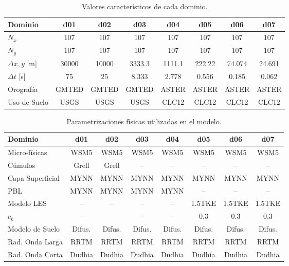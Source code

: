 \begin{table}[h!]
	\caption{Valores característicos de cada dominio.}\label{tab:05_caract_hov}
	\centering\footnotesize
	\begin{tabular}{lccccccc}
		\toprule
		Dominio 				& d01	&	d02	&	d03	&	d04	&	d05	&	d06 &	d07 \\
		\midrule
		$N_x$		& 107 & 107 & 107 &107&107&107&107  \\
		$N_y$	 		& 107 & 107 & 107 &107&107&107&107  \\
		$\Delta x, y$	[m]	 		& 30000 & 10000 & 3333.3 &1111.1&222.22&74.074&24.691  \\
		$\Delta t$	[s]	 		& 75 & 25 & 8.333 &2.778&0.556&0.185&0.062  \\
		Orografía		 	& GMTED & GMTED & GMTED &ASTER&ASTER&ASTER&ASTER  \\
		Uso de Suelo					& USGS & USGS & USGS &CLC12&CLC12&CLC12&CLC12 \\
		\bottomrule
	\end{tabular}
\end{table}

\begin{table}[h!]
	\caption{Parametrizaciones físicas utilizadas en el modelo.}\label{tab:05_param_hov}
	\centering\footnotesize
	\begin{tabular}{lccccccc}
		\toprule
		Dominio 				& d01	&	d02	&	d03	&	d04	&	d05	&	d06 &	d07 \\
		\midrule
		Micro-físicas		 	& WSM5 & WSM5 & WSM5 &WSM5&WSM5&WSM5&WSM5  \\
		Cúmulos			 		& Grell & Grell & -- & -- & -- & -- & -- \\ 
		Capa Superficial	 	& MYNN & MYNN & MYNN & MYNN & MYNN & MYNN & MYNN \\
		PBL				 		& MYNN & MYNN & MYNN & MYNN & -- & -- & -- \\
		Modelo LES				 		& -- & -- & -- & -- & 1.5TKE & 1.5TKE & 1.5TKE \\
		$c_k$				 		& -- & -- & -- & -- & 0.3 & 0.3 & 0.3 \\
		Modelo de Suelo 		& Difus.\footnotemark & Difus. & Difus. & Difus. & Difus. & Difus. & Difus. \\
		Rad. Onda Larga	& RRTM &RRTM&RRTM&RRTM&RRTM&RRTM&RRTM \\
		Rad. Onda Corta	& Dudhia &Dudhia&Dudhia&Dudhia&Dudhia&Dudhia&Dudhia \\
		\bottomrule
	\end{tabular}
\end{table}

